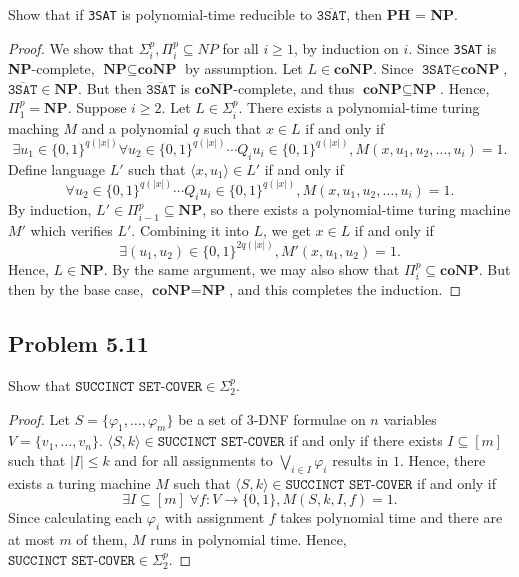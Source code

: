 \documentclass[a4paper]{article}
\begin{document}
Show that if \texttt{3SAT} is polynomial-time reducible to $\overline{\texttt{3SAT}}$, then \textbf{PH} = \textbf{NP}.

\begin{proof}
  We show that $\Sigma_i^p, \Pi_i^p \subseteq NP$ for all $i \geq 1$, by induction on $i$. Since \texttt{3SAT} is \textbf{NP}-complete, $\textbf{NP} \subseteq \textbf{coNP}$ by assumption. Let $L \in \textbf{coNP}$. Since $\texttt{3SAT} \in \textbf{coNP}$, $\overline{\texttt{3SAT}} \in \textbf{NP}$. But then $\overline{\texttt{3SAT}}$ is $\textbf{coNP}$-complete, and thus $\textbf{coNP} \subseteq \textbf{NP}$. Hence, $\Pi_1^p = \textbf{NP}$. Suppose $i \geq 2$. Let $L \in \Sigma_i^p$. There exists a polynomial-time turing maching $M$ and a polynomial $q$ such that $x \in L$ if and only if
  \[
    \exists u_1 \in \{0, 1\}^{q(|x|)} \forall u_2 \in \{0, 1\}^{q(|x|)} \cdots Q_iu_i \in \{0, 1\}^{q(|x|)}, M(x, u_1, u_2, \ldots, u_i) = 1.
  \]
  Define language $L'$ such that $\langle x, u_1 \rangle \in L'$ if and only if
  \[
    \forall u_2 \in \{0, 1\}^{q(|x|)} \cdots Q_iu_i \in \{0, 1\}^{q(|x|)}, M(x, u_1, u_2, \ldots, u_i) = 1.
  \]
  By induction, $L' \in \Pi_{i - 1}^p \subseteq \textbf{NP}$, so there exists a polynomial-time turing machine $M'$ which verifies $L'$. Combining it into $L$, we get $x \in L$ if and only if
  \[
    \exists (u_1, u_2) \in \{0, 1\}^{2q(|x|)}, M'(x, u_1, u_2) = 1.
  \]
  Hence, $L \in \textbf{NP}$. By the same argument, we may also show that $\Pi_i^p \subseteq \textbf{coNP}$. But then by the base case, $\textbf{coNP} = \textbf{NP}$, and this completes the induction. 
\end{proof}

\subsection*{Problem 5.11}

Show that $\texttt{SUCCINCT SET-COVER} \in \Sigma_2^p$. 

\begin{proof}
  Let $S = \{\varphi_1, \ldots, \varphi_m\}$ be a set of 3-DNF formulae on $n$ variables $V = \{v_1, \ldots, v_n\}$. $\langle S, k \rangle \in \texttt{SUCCINCT SET-COVER}$ if and only if there exists $I \subseteq [m]$ such that $|I| \leq k$ and for all assignments to $\bigvee_{i \in I} \varphi_i$ results in $1$. Hence, there exists a turing machine $M$ such that $\langle S, k \rangle \in \texttt{SUCCINCT SET-COVER}$ if and only if
  \[
    \exists I \subseteq [m] \; \forall f: V \to \{0, 1\}, M(S, k, I, f) = 1.
  \]
  Since calculating each $\varphi_i$ with assignment $f$ takes polynomial time and there are at most $m$ of them, $M$ runs in polynomial time. Hence, $\texttt{SUCCINCT SET-COVER} \in \Sigma_2^p$. 
\end{proof}
\end{document}
